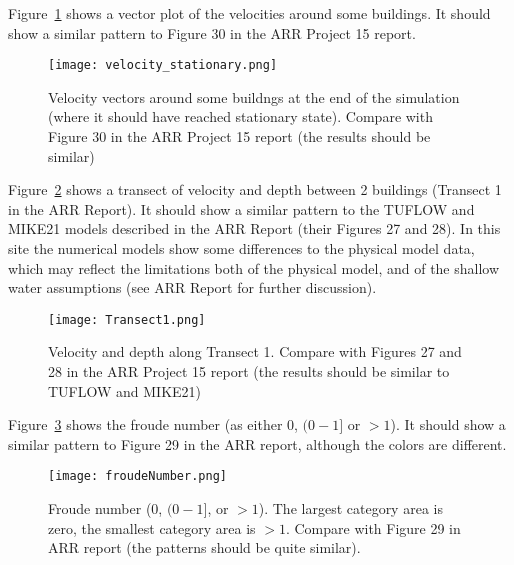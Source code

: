 \documentclass{article}
\begin{document}
Figure~\ref{fig:stationary_vel} shows a vector plot of the velocities around some buildings. It should
show a similar pattern to Figure 30 in the ARR Project 15 report.

\begin{figure}[h]
\begin{center}
\texttt{[image: velocity\_stationary.png]}
\end{center}
\caption{Velocity vectors around some buildngs at the end of the simulation
(where it should have reached stationary state). Compare with Figure 30 in the ARR Project 15 report (the results should be similar)}
\label{fig:stationary_vel}
\end{figure}








Figure~\ref{fig:transect1} shows a transect of velocity and depth between 2 buildings (Transect
1 in the ARR Report).  It should show a similar pattern to the TUFLOW and
MIKE21 models described in the ARR Report (their Figures 27 and 28).  In this
site the numerical models show some differences to the physical model data,
which may reflect the limitations both of the physical model, and of the
shallow water assumptions (see ARR Report for further discussion).
\begin{figure}
\texttt{[image: Transect1.png]}
\caption{Velocity and depth along Transect 1. Compare with Figures 27 and 28 
in the ARR Project 15 report (the results should be similar to TUFLOW and
MIKE21)}
\label{fig:transect1}
\end{figure}

Figure~\ref{fig:froude} shows the froude number (as either 0, $(0-1]$ or $>1$).  It
should show a similar pattern to Figure 29 in the ARR report, although the
colors are different. 
\begin{figure}
\center
\texttt{[image: froudeNumber.png]}
\caption{Froude number (0, $(0-1]$, or $>1$). The largest category area is
zero, the smallest category area is $>1$. Compare with Figure 29 in ARR report
(the patterns should be quite similar).}
\label{fig:froude}
\end{figure}
\end{document}

